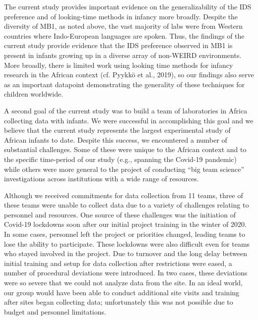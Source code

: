 \documentclass[
  ,man,floatsintext]{apa6}
\begin{document}
The current study provides important evidence on the generalizability of the IDS preference and of looking-time methods in infancy more broadly. Despite the diversity of MB1, as noted above, the vast majority of labs were from Western countries where Indo-European languages are spoken. Thus, the findings of the current study provide evidence that the IDS preference observed in MB1 is present in infants growing up in a diverse array of non-WEIRD environments. More broadly, there is limited work using looking time methods for infancy research in the African context (cf. Pyykkö et al., 2019), so our findings also serve as an important datapoint demonstrating the generality of these techniques for children worldwide.

A second goal of the current study was to build a team of laboratories in Africa collecting data with infants. We were successful in accomplishing this goal and we believe that the current study represents the largest experimental study of African infants to date. Despite this success, we encountered a number of substantial challenges. Some of these were unique to the African context and to the specific time-period of our study (e.g., spanning the Covid-19 pandemic) while others were more general to the project of conducting ``big team science'' investigations across institutions with a wide range of resources.

Although we received commitments for data collection from 11 teams, three of these teams were unable to collect data due to a variety of challenges relating to personnel and resources. One source of these challenges was the initiation of Covid-19 lockdowns soon after our initial project training in the winter of 2020. In some cases, personnel left the project or priorities changed, leading teams to lose the ability to participate. These lockdowns were also difficult even for teams who stayed involved in the project. Due to turnover and the long delay between initial training and setup for data collection after restrictions were eased, a number of procedural deviations were introduced. In two cases, these deviations were so severe that we could not analyze data from the site. In an ideal world, our group would have been able to conduct additional site visits and training after sites began collecting data; unfortunately this was not possible due to budget and personnel limitations.
\end{document}
